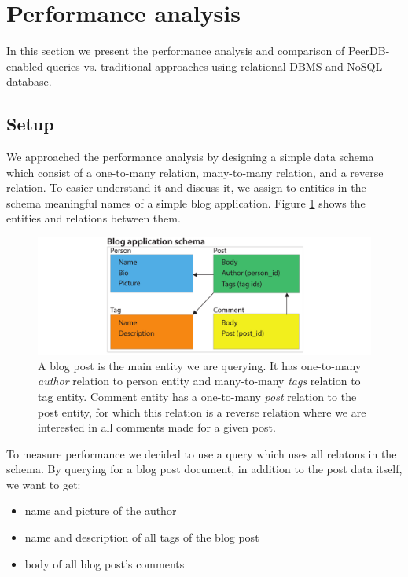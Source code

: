 \section{Performance analysis}

In this section we present the performance analysis and comparison of PeerDB-enabled queries vs. traditional approaches using relational DBMS and NoSQL database.

\subsection{Setup}

We approached the performance analysis by designing a simple data schema which consist of a one-to-many relation, many-to-many relation, and a reverse relation.
To easier understand it and discuss it, we assign to entities in the schema meaningful names of a simple blog application.
Figure \ref{schema} shows the entities and relations between them.

\begin{figure}[!h]
\centering
\includegraphics[width=0.9\columnwidth]{schema}
\caption{A blog post is the main entity we are querying. It has one-to-many \emph{author} relation to person entity and many-to-many \emph{tags} relation to tag entity. Comment entity has a one-to-many \emph{post} relation to the post entity, for which this relation is a reverse relation where we are interested in all comments made for a given post.}
\label{schema}
\end{figure}

To measure performance we decided to use a query which uses all relatons in the schema.
By querying for a blog post document, in addition to the post data itself, we want to get:
\begin{itemize}
\item name and picture of the author
\item name and description of all tags of the blog post
\item body of all blog post's comments
\end{itemize}

